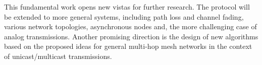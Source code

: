 \documentclass[letterpaper,conference]{IEEEtran}
\begin{document}
This fundamental work opens new vistas for further research. The protocol will be extended to more general systems, including path loss and channel fading, various network topologies, asynchronous nodes and, the more challenging case of analog transmissions. Another promising direction is the design of new algorithms based on the proposed ideas for general multi-hop mesh networks in the context of unicast/multicast transmissions.





\end{document}
